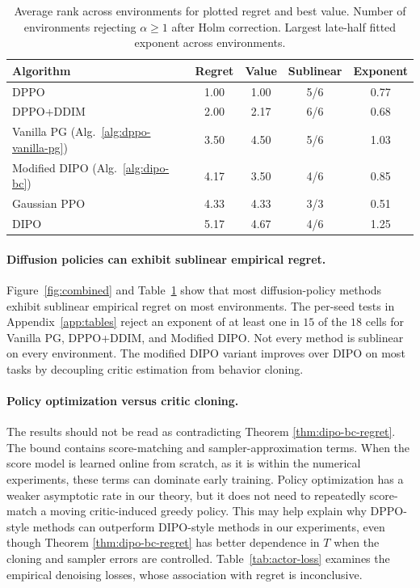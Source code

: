 \begin{table}[H]

    \centering
    \small
    \renewcommand{\arraystretch}{1.15}
    \begin{tabular}{|l|c|c|c|c|}
        \hline \bf Algorithm & \bf Regret & \bf Value & \bf  Sublinear & \bf Exponent \\
        \hline DPPO & 1.00 & 1.00 & 5/6 & 0.77 \\
        \hline DPPO+DDIM & 2.00 & 2.17 & 6/6 & 0.68 \\
        \hline Vanilla PG (Alg.~\ref{alg:dppo-vanilla-pg}) & 3.50 & 4.50 & 5/6 & 1.03 \\
        \hline Modified DIPO (Alg.~\ref{alg:dipo-bc}) & 4.17 & 3.50 & 4/6 & 0.85 \\
        \hline Gaussian PPO & 4.33 & 4.33 & 3/3 & 0.51 \\
        \hline DIPO & 5.17 & 4.67 & 4/6 & 1.25 \\
        \hline
        \end{tabular}

    \caption[Summary statistics and empirical regret exponents across Gym and Robomimic benchmarks]{Average rank across environments for plotted regret and best value. Number of environments rejecting $\alpha\ge1$ after Holm correction. Largest late-half fitted exponent across environments.}
    \label{tab:statistics}
\end{table}
\noindent


\paragraph{Diffusion policies can exhibit sublinear empirical regret.}
Figure~\ref{fig:combined} and Table~\ref{tab:statistics} show that most diffusion-policy methods exhibit sublinear empirical regret on most environments. The per-seed tests in Appendix~\ref{app:tables} reject an exponent of at least one in $15$ of the $18$ cells for Vanilla PG, DPPO+DDIM, and Modified DIPO. Not every method is sublinear on
every environment. The modified DIPO variant improves over DIPO on most tasks by decoupling critic estimation
from behavior cloning.


\paragraph{Policy optimization versus critic cloning.}
The results should not be read as contradicting Theorem \ref{thm:dipo-bc-regret}. The bound contains score-matching and sampler-approximation terms. When the score
model is learned online from scratch, as it is within the numerical experiments, these terms can dominate early training. Policy optimization
has a weaker asymptotic rate in our theory, but it does not need to repeatedly score-match a moving
critic-induced greedy policy. This may help explain why DPPO-style methods can outperform DIPO-style
methods in our experiments, even though Theorem \ref{thm:dipo-bc-regret} has better dependence in $T$ when the cloning and sampler errors are controlled. Table~\ref{tab:actor-loss} examines the empirical denoising losses, whose association with regret is inconclusive.

